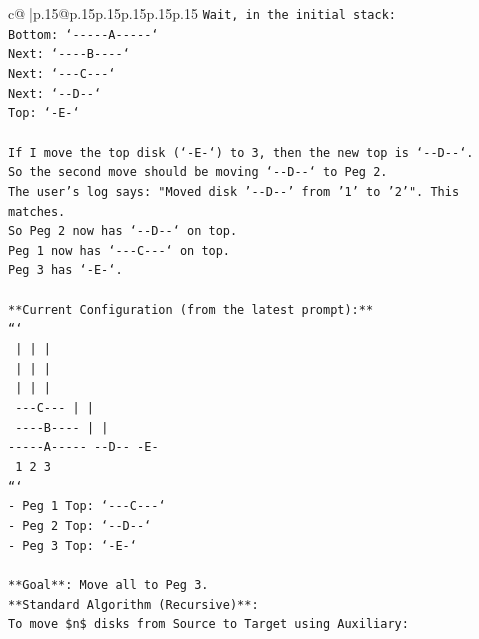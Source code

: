 \documentclass{article}
\begin{document}
{\begin{supertabular}{c@{$\;$}|p{.15\linewidth}@{}p{.15\linewidth}p{.15\linewidth}p{.15\linewidth}p{.15\linewidth}p{.15\linewidth}}
{{{\texttt{Wait, in the initial stack:} \\
\texttt{Bottom: `{-}{-}{-}{-}{-}A{-}{-}{-}{-}{-}`} \\
\texttt{Next: `{-}{-}{-}{-}B{-}{-}{-}{-}`} \\
\texttt{Next: `{-}{-}{-}C{-}{-}{-}`} \\
\texttt{Next: `{-}{-}D{-}{-}`} \\
\texttt{Top: `{-}E{-}`} \\
\\ 
\texttt{If I move the top disk (`{-}E{-}`) to 3, then the new top is `{-}{-}D{-}{-}`.} \\
\texttt{So the second move should be moving `{-}{-}D{-}{-}` to Peg 2.} \\
\texttt{The user's log says: "Moved disk '{-}{-}D{-}{-}' from '1' to '2'". This matches.} \\
\texttt{So Peg 2 now has `{-}{-}D{-}{-}` on top.} \\
\texttt{Peg 1 now has `{-}{-}{-}C{-}{-}{-}` on top.} \\
\texttt{Peg 3 has `{-}E{-}`.} \\
\\ 
\texttt{**Current Configuration (from the latest prompt):**} \\
\texttt{```} \\
\texttt{     |           |           |     } \\
\texttt{     |           |           |     } \\
\texttt{     |           |           |     } \\
\texttt{  {-}{-}{-}C{-}{-}{-}        |           |     } \\
\texttt{ {-}{-}{-}{-}B{-}{-}{-}{-}       |           |     } \\
\texttt{{-}{-}{-}{-}{-}A{-}{-}{-}{-}{-}    {-}{-}D{-}{-}        {-}E{-}    } \\
\texttt{     1           2           3     } \\
\texttt{```} \\
\texttt{{-} Peg 1 Top: `{-}{-}{-}C{-}{-}{-}`} \\
\texttt{{-} Peg 2 Top: `{-}{-}D{-}{-}`} \\
\texttt{{-} Peg 3 Top: `{-}E{-}`} \\
\\ 
\texttt{**Goal**: Move all to Peg 3.} \\
\texttt{**Standard Algorithm (Recursive)**:} \\
\texttt{To move \$n\$ disks from Source to Target using Auxiliary:} \\
}}}
\end{supertabular}}
\end{document}
